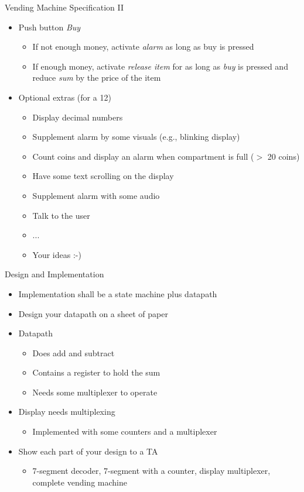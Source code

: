 \begin{frame}[fragile]{Vending Machine Specification II}
\begin{itemize}
\item Push button \emph{Buy}
\begin{itemize}
\item If not enough money, activate \emph{alarm} as long as buy is pressed
\item If enough money, activate \emph{release item} for as long as \emph{buy}
is pressed and reduce \emph{sum} by the price of the item
\end{itemize}
\item Optional extras (for a 12)
\begin{itemize}
\item Display decimal numbers
\item Supplement alarm by some visuals (e.g., blinking display)
\item Count coins and display an alarm when compartment is full ($>$ 20 coins)
\item Have some text scrolling on the display
\item Supplement alarm with some audio
\item Talk to the user
\item ...
\item Your ideas :-)
\end{itemize}
\end{itemize}
\end{frame}

\begin{frame}[fragile]{Design and Implementation}
\begin{itemize}
\item Implementation shall be a state machine plus datapath
\item Design your datapath on a sheet of paper
\item Datapath
\begin{itemize}
\item Does add and subtract
\item Contains a register to hold the sum
\item Needs some multiplexer to operate
\end{itemize}
\item Display needs multiplexing
\begin{itemize}
\item Implemented with some counters and a multiplexer
\end{itemize}
\item Show each part of your design to a TA
\begin{itemize}
\item 7-segment decoder, 7-segment with a counter, display multiplexer, complete vending machine
\end{itemize}
\end{itemize}
\end{frame}

